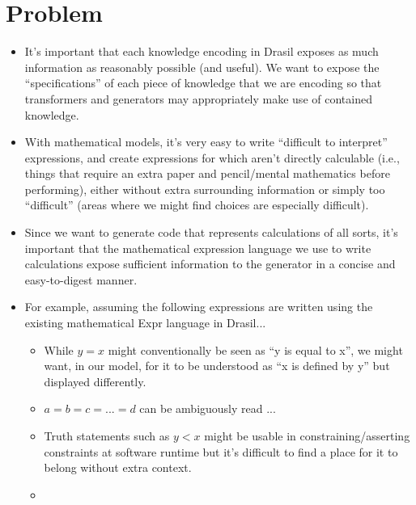 
\section{Problem}

\begin{itemize}

	\item It's important that each knowledge encoding in Drasil exposes as much
	      information as reasonably possible (and useful).  We want to expose the ``specifications'' of each piece
	      of knowledge that we are encoding so that transformers and generators
	      may appropriately make use of contained knowledge.

	\item With mathematical models, it's very easy to write ``difficult to
	      interpret'' expressions, and create expressions for which aren't
	      directly calculable (i.e., things that require an extra paper and
	      pencil/mental mathematics before performing), either without
	      extra surrounding information or simply too ``difficult'' (areas
	      where we might find choices are especially difficult).

	\item Since we want to generate code that represents calculations of all
	      sorts, it's important that the mathematical expression language we
	      use to write calculations expose sufficient information to the
	      generator in a concise and easy-to-digest manner. 

	\item For example, assuming the following expressions are written using
	      the existing mathematical Expr language in Drasil...
	      \begin{itemize}

		      \item While \(y = x\) might conventionally be seen as ``y is
		            equal to x'', we might want, in our model, for it to be
		            understood as ``x is defined by y'' but displayed differently.

		      \item \(a = b = c = ... = d\) can be ambiguously read ...

		      \item Truth statements such as \(y < x\) might be usable in
		            constraining/asserting constraints at software runtime
		            but it's difficult to find a place for it to belong
		            without extra context.

		      \item {}

	      \end{itemize}

\end{itemize}

